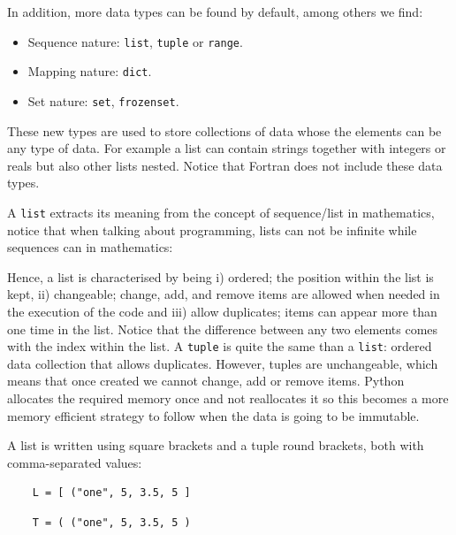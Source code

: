 In addition, more data types can be found by default, among others we find:
\begin{itemize}
    \item Sequence nature: \texttt{list}, \texttt{tuple} or \texttt{range}.
    \item Mapping nature: \texttt{dict}.
    \item Set nature: \texttt{set}, \texttt{frozenset}.
\end{itemize}
These new types are used to store collections of data whose the elements can be any type of data. 
For example a list can contain strings together with integers or reals but also other lists nested. 
Notice that Fortran does not include these data types.






A \texttt{list} extracts its meaning from the concept of sequence/list in mathematics, notice that when talking about programming, lists can not be infinite while sequences can in mathematics:



Hence, a list is characterised by being i) ordered; the position within the list is kept, ii) changeable; change, add, and remove items are allowed when needed in the execution of the code and iii) allow duplicates; items can appear more than one time in the list. Notice that the difference between any two elements comes with the index within the list.
A \texttt{tuple} is quite the same than a \texttt{list}: ordered data collection that allows duplicates. 
However, tuples are unchangeable, which means that once created we cannot change, add or remove items. 
Python allocates the required memory once and not reallocates it so this becomes a more memory efficient strategy to follow when the data is going to be immutable.

A list is written using square brackets and a tuple round brackets, both with comma-separated values:
\begin{verbatim}
    L = [ ("one", 5, 3.5, 5 ]
\end{verbatim}
\begin{verbatim}
    T = ( ("one", 5, 3.5, 5 )
\end{verbatim}









